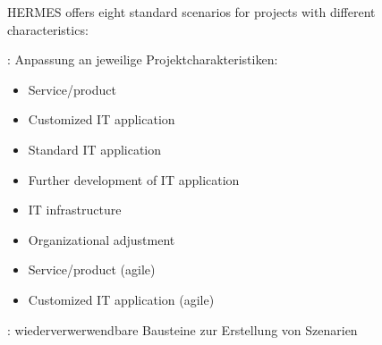 \begin{minipage}[t]{0.5\linewidth}
\newslide

HERMES offers eight standard scenarios for projects with different characteristics:

: Anpassung an jeweilige Projektcharakteristiken:
\begin{itemize}

\item Service/product
\item Customized IT application
\item Standard IT application
\item Further development of IT application
\item IT infrastructure
\item Organizational adjustment
\item Service/product (agile)
\item Customized IT application (agile)
\end{itemize}

: wiederverwerwendbare Bausteine zur Erstellung von Szenarien
\begin{itemize}


\end{itemize}
\end{minipage}
